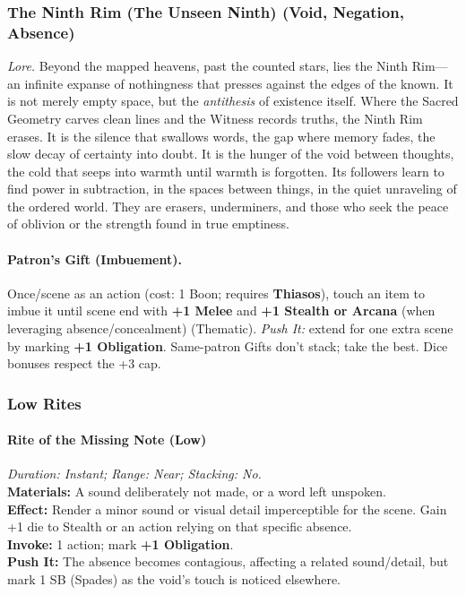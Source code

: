 
\subsubsection{The Ninth Rim (The Unseen Ninth) (Void, Negation, Absence)}
\label{patron:ninth-rim}
\textit{Lore.} Beyond the mapped heavens, past the counted stars, lies the Ninth Rim—an infinite expanse of nothingness that presses against the edges of the known. It is not merely empty space, but the \emph{antithesis} of existence itself. Where the Sacred Geometry carves clean lines and the Witness records truths, the Ninth Rim erases. It is the silence that swallows words, the gap where memory fades, the slow decay of certainty into doubt. It is the hunger of the void between thoughts, the cold that seeps into warmth until warmth is forgotten. Its followers learn to find power in subtraction, in the spaces between things, in the quiet unraveling of the ordered world. They are erasers, underminers, and those who seek the peace of oblivion or the strength found in true emptiness.

\paragraph{Patron's Gift (Imbuement).}
Once/scene as an action (cost: 1 Boon; requires \textbf{Thiasos}), touch an item to imbue it until scene end with \textbf{+1 Melee} and \textbf{+1 Stealth or Arcana} (when leveraging absence/concealment) (Thematic). \emph{Push It:} extend for one extra scene by marking \textbf{+1 Obligation}. Same-patron Gifts don’t stack; take the best. Dice bonuses respect the +3 cap.

\subsubsection*{Low Rites}

\paragraph{Rite of the Missing Note (Low)}
\emph{Duration: Instant; Range: Near; Stacking: No.}\\
\textbf{Materials:} A sound deliberately not made, or a word left unspoken.\\
\textbf{Effect:} Render a minor sound or visual detail imperceptible for the scene. Gain +1 die to Stealth or an action relying on that specific absence.\\
\textbf{Invoke:} 1 action; mark \textbf{+1 Obligation}.\\
\textbf{Push It:} The absence becomes contagious, affecting a related sound/detail, but mark 1 SB (Spades) as the void's touch is noticed elsewhere.

